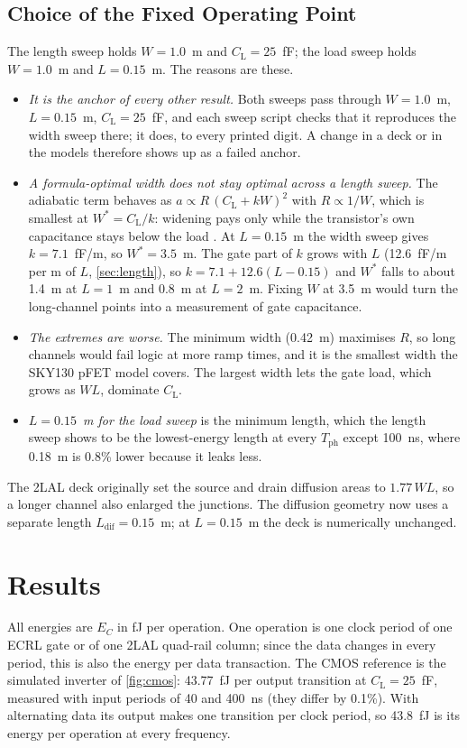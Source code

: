 \documentclass[conference]{IEEEtran}
\newcommand{\CL}{C_{\mathrm{L}}}
\newcommand{\Tph}{T_{\mathrm{ph}}}
\begin{document}
\subsection{Choice of the Fixed Operating Point}
\label{sec:fixedpoint}
The length sweep holds $W=1.0$~\textmu m and $\CL=25$~fF; the load sweep holds
$W=1.0$~\textmu m and $L=0.15$~\textmu m. The reasons are these.
\begin{itemize}
\item \emph{It is the anchor of every other result.} Both sweeps pass through
  $W=1.0$~\textmu m, $L=0.15$~\textmu m, $\CL=25$~fF, and each sweep script
  checks that it reproduces the width sweep there; it does, to every printed
  digit. A change in a deck or in the models therefore shows up as a failed
  anchor.
\item \emph{A formula-optimal width does not stay optimal across a length
  sweep.} The adiabatic term behaves as $a\propto R\,(\CL+kW)^2$ with
  $R\propto1/W$, which is smallest at $W^{*}=\CL/k$: widening pays only while
  the transistor's own capacitance stays below the load
  \cite{fischer2003,fischer2004}. At $L=0.15$~\textmu m the width sweep gives
  $k=7.1$~fF/\textmu m, so $W^{*}=3.5$~\textmu m. The gate part of $k$ grows
  with $L$ (12.6~fF/\textmu m per \textmu m of $L$, \cref{sec:length}), so
  $k=7.1+12.6(L-0.15)$ and $W^{*}$ falls to about 1.4~\textmu m at
  $L=1$~\textmu m and 0.8~\textmu m at $L=2$~\textmu m. Fixing $W$ at
  3.5~\textmu m would turn the long-channel points into a measurement of gate
  capacitance.
\item \emph{The extremes are worse.} The minimum width (0.42~\textmu m)
  maximises $R$, so long channels would fail logic at more ramp times, and it
  is the smallest width the SKY130 pFET model covers. The largest width lets
  the gate load, which grows as $WL$, dominate $\CL$.
\item \emph{$L=0.15$~\textmu m for the load sweep} is the minimum length,
  which the length sweep shows to be the lowest-energy length at every $\Tph$
  except 100~ns, where 0.18~\textmu m is 0.8\% lower because it leaks less.
\end{itemize}
The 2LAL deck originally set the source and drain diffusion areas to
$1.77\,W L$, so a longer channel also enlarged the junctions. The diffusion
geometry now uses a separate length $L_{\mathrm{dif}}=0.15$~\textmu m; at
$L=0.15$~\textmu m the deck is numerically unchanged.

\section{Results}
\label{sec:results}
All energies are $E_C$ in fJ per operation. One operation is one clock period
of one ECRL gate or of one 2LAL quad-rail column; since the data changes in
every period, this is also the energy per data transaction. The CMOS
reference is the simulated inverter of \cref{fig:cmos}: 43.77~fJ per output
transition at $\CL=25$~fF, measured with input periods of 40 and 400~ns
(they differ by 0.1\%). With alternating data its output makes one transition
per clock period, so 43.8~fJ is its energy per operation at every frequency.
\end{document}
